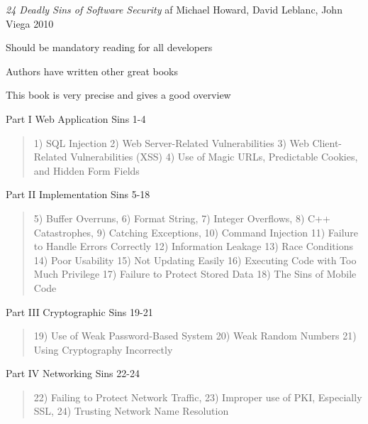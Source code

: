 \documentclass[Screen16to9,17pt]{foils}
\begin{document}

{\emph{24 Deadly Sins of Software Security} af Michael Howard, David Leblanc, John Viega 2010}

\begin{list1}
\item Should be mandatory reading for all developers
\item Authors have written other great books
\item This book is very precise and gives a good overview
\end{list1}


\begin{list1}
\item Part I Web Application Sins 1-4
\begin{quote}
1) SQL Injection
2) Web Server-Related Vulnerabilities
3) Web Client-Related Vulnerabilities (XSS)
4) Use of Magic URLs, Predictable Cookies, and Hidden Form Fields
\end{quote}
\item Part II Implementation Sins 5-18
\begin{quote}
5) Buffer Overruns, 6) Format String, 7) Integer Overflows,
8) C++ Catastrophes, 9) Catching Exceptions, 10) Command Injection
11) Failure to Handle Errors Correctly 12) Information Leakage
13) Race Conditions 14) Poor Usability
15) Not Updating Easily
16) Executing Code with Too Much Privilege
17) Failure to Protect Stored Data
18) The Sins of Mobile Code
\end{quote}
\end{list1}




\begin{list1}
\item Part III Cryptographic Sins 19-21
\begin{quote}
19) Use of Weak Password-Based System
20) Weak Random Numbers
21) Using Cryptography Incorrectly
\end{quote}
\item Part IV Networking Sins 22-24
\begin{quote}
22) Failing to Protect Network Traffic,
23) Improper use of PKI, Especially SSL,
24) Trusting Network Name Resolution
\end{quote}
\end{list1}
\end{document}
